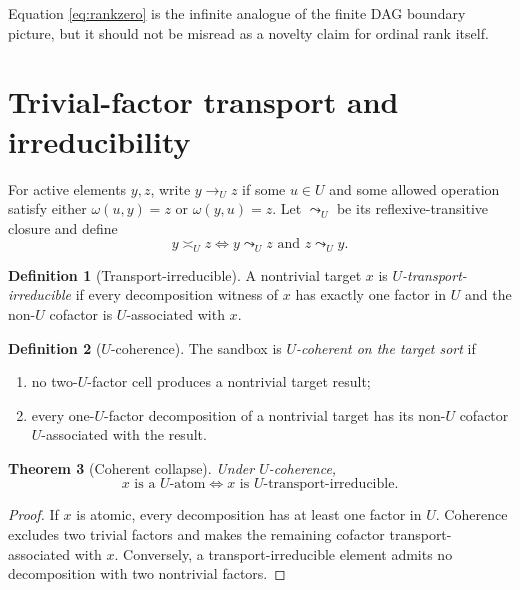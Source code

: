 \documentclass[11pt]{article}
\newtheorem{theorem}{Theorem}[section]
\theoremstyle{definition}
\newtheorem{definition}[theorem]{Definition}
\theoremstyle{remark}
\begin{document}
Equation \eqref{eq:rankzero} is the infinite analogue of the finite DAG boundary picture, but it should not be misread as a novelty claim for ordinal rank itself.

\section{Trivial-factor transport and irreducibility}

For active elements \(y,z\), write \(y\to_U z\) if some \(u\in U\) and some allowed operation satisfy either \(\omega(u,y)=z\) or \(\omega(y,u)=z\). Let \(\leadsto_U\) be its reflexive-transitive closure and define
\[
y\asymp_U z\iff y\leadsto_U z\text{ and }z\leadsto_U y.
\]

\begin{definition}[Transport-irreducible]
A nontrivial target \(x\) is \emph{\(U\)-transport-irreducible} if every decomposition witness of \(x\) has exactly one factor in \(U\) and the non-\(U\) cofactor is \(U\)-associated with \(x\).
\end{definition}

\begin{definition}[\(U\)-coherence]
The sandbox is \emph{\(U\)-coherent on the target sort} if
\begin{enumerate}[label=(\roman*)]
\item no two-\(U\)-factor cell produces a nontrivial target result;
\item every one-\(U\)-factor decomposition of a nontrivial target has its non-\(U\) cofactor \(U\)-associated with the result.
\end{enumerate}
\end{definition}

\begin{theorem}[Coherent collapse]
Under \(U\)-coherence,
\begin{equation}
\boxed{x\text{ is a }U\text{-atom}\iff x\text{ is }U\text{-transport-irreducible}.}
\label{eq:irreducible}
\end{equation}
\end{theorem}

\begin{proof}
If \(x\) is atomic, every decomposition has at least one factor in \(U\). Coherence excludes two trivial factors and makes the remaining cofactor transport-associated with \(x\). Conversely, a transport-irreducible element admits no decomposition with two nontrivial factors.
\end{proof}
\end{document}
